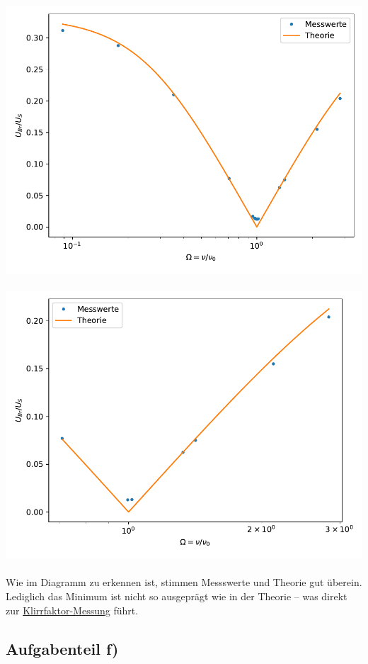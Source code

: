 \includegraphics[scale=0.8]{build/plot1.pdf}
\ \\
\includegraphics[scale=0.5]{build/plot2.pdf}
\ \\
Wie im Diagramm zu erkennen ist, stimmen Messswerte und Theorie gut überein.
Lediglich das Minimum ist nicht so ausgeprägt wie in der Theorie – was direkt zur \hyperref[sec:KlirrfaktorAuswertung]{Klirrfaktor-Messung} führt.

\subsection{Aufgabenteil f)}
\label{sec:KlirrfaktorAuswertung}

